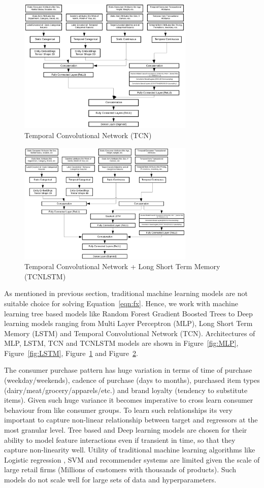   \begin{figure}[t]
    \centering 
    \includegraphics[width=3.3in]{img/TCN.png} 
    \caption{Temporal Convolutional Network (TCN)} 
    \label{fig:TCN} 
  \end{figure}

  \begin{figure}[t]
    \centering 
    \includegraphics[width=3.3in]{img/TCNLSTM.png} 
    \caption{Temporal Convolutional Network + Long Short Term Memory (TCNLSTM)} 
    \label{fig:TCNLSTM} 
  \end{figure}

As mentioned in previous section, traditional machine learning models are not suitable choice for solving Equation~\ref{eqn:fx}. 
Hence, we work with machine learning tree based models like Random Forest Gradient Boosted Trees 
to Deep learning models ranging from Multi Layer Perceptron (MLP), Long Short 
Term Memory (LSTM) and Temporal Convolutional Network (TCN). Architectures of MLP, LSTM, TCN and TCNLSTM 
models are shown in Figure~\ref{fig:MLP}, Figure~\ref{fig:LSTM}, Figure~\ref{fig:TCN}
and Figure~\ref{fig:TCNLSTM}.

The consumer purchase pattern has huge variation in terms of time of purchase (weekday/weekends), 
cadence of purchase (days to months), purchased item types (dairy/meat/grocery/apparels/etc.)
and brand loyalty (tendency to substitute items). Given such huge variance it becomes imperative 
to cross learn consumer behaviour from like consumer groups. To learn such relationships its very 
important to capture non-linear relationship between target and regressors at the most granular level.
Tree based and Deep learning models are chosen for their ability to model feature interactions even if transient in time, 
so that they capture non-linearity well. Utility of traditional machine learning algorithms like Logistic regression
, SVM and recommender systems are limited given the scale of large retail firms 
(Millions of customers with thousands of products). Such models do not scale well for large sets of data and hyperparameters.

